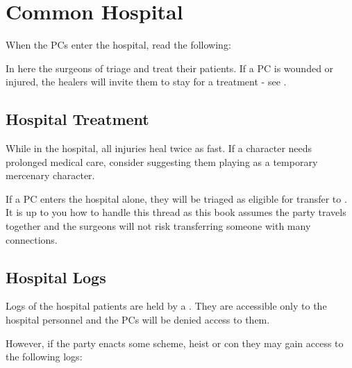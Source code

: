 \section{Common Hospital}
\label{sec:cityHospital}

When the PCs enter the hospital, read the following:


In here the surgeons of \locationKharbranth{} triage and treat their patients. If a PC is wounded or injured, the healers will invite them to stay for a treatment - see .


\subsection{Hospital Treatment}
\label{sec:cityHospitalTreatment}

While in the hospital, all injuries heal twice as fast. If a character needs prolonged medical care, consider suggesting them playing as a temporary mercenary character.

If a PC enters the hospital alone, they will be triaged as eligible for transfer to . It is up to you how to handle this thread as this book assumes the party travels together and the surgeons will not risk transferring someone with many connections.



\subsection{Hospital Logs}
\label{ssec:cityHospitalLogs}

Logs of the hospital patients are held by a \enemyDiagramScribe{}. They are accessible only to the hospital personnel and the PCs will be denied access to them.

However, if the party enacts some scheme, heist or con they may gain access to the following logs:

